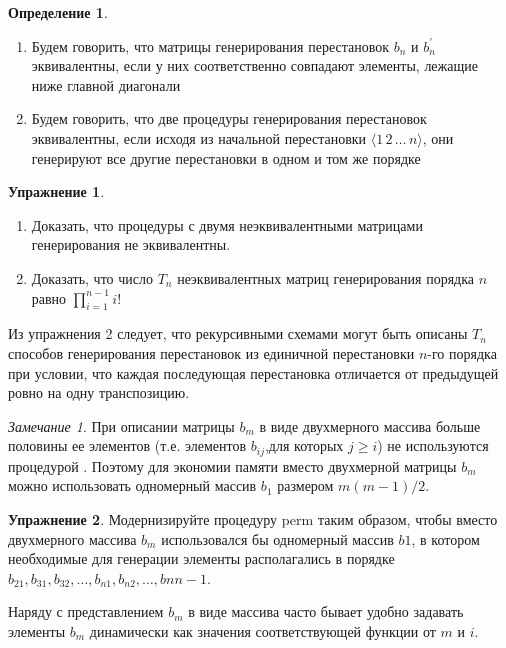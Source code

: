 \documentclass[12pt,a4paper]{article}
\theoremstyle{plain}
\theoremstyle{definition}
\newtheorem{definition}{Определение}
\newtheorem*{task}{Упражнение}
\theoremstyle{remark}
\newtheorem*{remark}{Замечание}
\begin{document}
\begin{definition}
\begin{enumerate}
\item Будем говорить, что матрицы генерирования перестановок $b_n$ и $b_n^{'}$ эквивалентны, если у них соответственно совпадают элементы, лежащие ниже главной диагонали
\item Будем говорить, что две процедуры генерирования перестановок эквивалентны, если исходя из начальной перестановки $\langle 1\,2\,\ldots\,n\rangle$, они генерируют все другие перестановки в одном и том же порядке
\end{enumerate}
\end{definition}

\begin{task}
\begin{enumerate}
\item Доказать, что процедуры \verb@PERM@ с двумя неэквивалентными матрицами генерирования не эквивалентны.
\item Доказать, что число $T_n$ неэквивалентных матриц генерирования порядка $n$ равно $\prod_{i=1}^{n-1} i!$
\end{enumerate}
\end{task}

Из упражнения 2 следует, что рекурсивными схемами могут быть описаны $T_n$ способов генерирования перестановок из единичной перестановки $n$-го порядка при условии, что каждая последующая перестановка отличается от предыдущей ровно на одну транспозицию.

\begin{remark}
При описании матрицы $b_m$ в виде двухмерного массива больше половины ее элементов (т.е. элементов $b_{ij}$,для которых $j\ge i$) не используются процедурой \verb@PERM@. Поэтому для экономии памяти вместо двухмерной матрицы $b_m$ можно использовать одномерный массив $b_1$ размером $m(m-1)/2$.
\end{remark}

\begin{task}
Модернизируйте процедуру perm таким образом, чтобы вместо двухмерного массива $b_m$ использовался бы одномерный массив $b1$, в котором необходимые для генерации элементы располагались в порядке $b_{21}, b_{31}, b_{32},\ldots,b_{n1}, b_{n2},\ldots,b{nn-1}$.
\end{task}

Наряду с представлением $b_m$ в виде массива часто бывает удобно задавать элементы $b_m$ динамически как значения соответствующей функции от $m$ и $i$.
\end{document}
